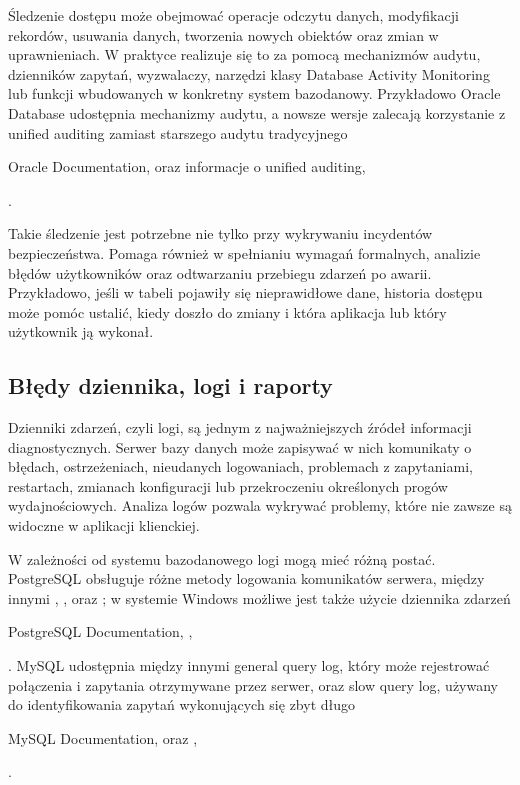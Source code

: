 \documentclass[letterpaper,10pt,polish]{sphinxmanual}
\begin{document}
\sphinxAtStartPar
Śledzenie dostępu może obejmować operacje odczytu danych, modyfikacji rekordów, usuwania danych, tworzenia nowych obiektów oraz zmian w uprawnieniach. W praktyce realizuje się to za pomocą mechanizmów audytu, dzienników zapytań, wyzwalaczy, narzędzi klasy Database Activity Monitoring lub funkcji wbudowanych w konkretny system bazodanowy. Przykładowo Oracle Database udostępnia mechanizmy audytu, a nowsze wersje zalecają korzystanie z unified auditing zamiast starszego audytu tradycyjnego %
\begin{footnote}[3]\sphinxAtStartFootnote
Oracle Documentation,  oraz informacje o unified auditing, 
%
\end{footnote}.

\sphinxAtStartPar
Takie śledzenie jest potrzebne nie tylko przy wykrywaniu incydentów bezpieczeństwa. Pomaga również w spełnianiu wymagań formalnych, analizie błędów użytkowników oraz odtwarzaniu przebiegu zdarzeń po awarii. Przykładowo, jeśli w tabeli pojawiły się nieprawidłowe dane, historia dostępu może pomóc ustalić, kiedy doszło do zmiany i która aplikacja lub który użytkownik ją wykonał.


\subsection{Błędy dziennika, logi i raporty}
\label{\detokenize{rozdzia_u0142_2/rozdzia_u0142_24/index:bledy-dziennika-logi-i-raporty}}
\sphinxAtStartPar
Dzienniki zdarzeń, czyli logi, są jednym z najważniejszych źródeł informacji diagnostycznych. Serwer bazy danych może zapisywać w nich komunikaty o błędach, ostrzeżeniach, nieudanych logowaniach, problemach z zapytaniami, restartach, zmianach konfiguracji lub przekroczeniu określonych progów wydajnościowych. Analiza logów pozwala wykrywać problemy, które nie zawsze są widoczne w aplikacji klienckiej.

\sphinxAtStartPar
W zależności od systemu bazodanowego logi mogą mieć różną postać. PostgreSQL obsługuje różne metody logowania komunikatów serwera, między innymi , ,  oraz ; w systemie Windows możliwe jest także użycie dziennika zdarzeń %
\begin{footnote}[4]\sphinxAtStartFootnote
PostgreSQL Documentation, , 
%
\end{footnote}. MySQL udostępnia między innymi general query log, który może rejestrować połączenia i zapytania otrzymywane przez serwer, oraz slow query log, używany do identyfikowania zapytań wykonujących się zbyt długo %
\begin{footnote}[5]\sphinxAtStartFootnote
MySQL Documentation,  oraz , 
%
\end{footnote}.
\end{document}
